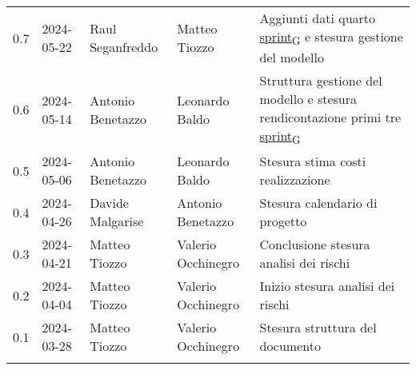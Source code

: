 \documentclass[12pt]{article} %
\begin{document}
\begin{table}[!h]
\begin{center}
\begin{tabular}{ l l l l p{6cm} }
			0.7 & 2024-05-22 & Raul Seganfreddo   & Matteo Tiozzo      & Aggiunti dati quarto \href{https://7last.github.io/docs/pb/documentazione-interna/glossario\#sprint}{sprint\textsubscript{G}} e stesura gestione del modello \\
			0.6 & 2024-05-14 & Antonio Benetazzo  & Leonardo Baldo     & Struttura gestione del modello e stesura rendicontazione primi tre \href{https://7last.github.io/docs/pb/documentazione-interna/glossario\#sprint}{sprint\textsubscript{G}}  \\
			0.5 & 2024-05-06 & Antonio Benetazzo  & Leonardo Baldo     & Stesura stima costi realizzazione \\
			0.4 & 2024-04-26 & Davide Malgarise   & Antonio Benetazzo  & Stesura calendario di progetto \\
			0.3 & 2024-04-21 & Matteo Tiozzo      & Valerio Occhinegro & Conclusione stesura analisi dei rischi \\
			0.2 & 2024-04-04 & Matteo Tiozzo      & Valerio Occhinegro & Inizio stesura analisi dei rischi \\
			0.1 & 2024-03-28 & Matteo Tiozzo      & Valerio Occhinegro & Stesura struttura del documento \\
			\\[-1.5ex] \hline
		\end{tabular}
	\end{center}
\end{table}

\newpage

\tableofcontents

\newpage

\listoftables

\listoffigures

\newpage



\newpage



\newpage



\newpage



\newpage



\newpage


\end{document}
